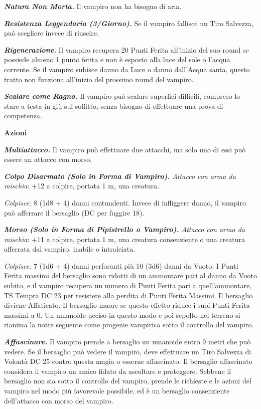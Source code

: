 \begin{multicols}{2}
{\emph{\textbf{Natura Non Morta.}} Il vampiro non ha bisogno di aria.

\emph{\textbf{Resistenza Leggendaria (3/Giorno).}} Se il vampiro fallisce un Tiro Salvezza, può scegliere invece di riuscire.

\emph{\textbf{Rigenerazione.}} Il vampiro recupera 20 Punti Ferita all'inizio del suo round se possiede almeno 1 punto ferita e non è esposto alla luce del sole o l'acqua corrente. Se il vampiro subisce danno da Luce o danno dall'Acqua santa, questo tratto non funziona all'inizio del prossimo round del vampiro.

\emph{\textbf{Scalare come Ragno.}} Il vampiro può scalare superfici difficili, compreso lo stare a testa in giù sul soffitto, senza bisogno di effettuare una prova di competenza.

\textbf{Azioni}

\emph{\textbf{Multiattacco.}} Il vampiro può effettuare due attacchi, ma solo uno di essi può essere un attacco con morso.

\emph{\textbf{Colpo Disarmato (Solo in Forma di Vampiro).} Attacco con arma da mischia}: +12 a colpire, portata 1 m, una creatura.

\emph{Colpisce:} 8 (1d8 + 4) danni contundenti. Invece di infliggere danno, il vampiro può afferrare il bersaglio (DC per fuggire 18).

\emph{\textbf{Morso (Solo in Forma di Pipistrello o Vampiro).} Attacco con arma da mischia}: +11 a colpire, portata 1 m, una creatura consenziente o una creatura afferrata dal vampiro, inabile o intralciata.

\emph{Colpisce:} 7 (1d6 + 4) danni perforanti più 10 (3d6) danni da Vuoto. I Punti Ferita massimi del bersaglio sono ridotti di un ammontare pari al danno da Vuoto subito, e il vampiro recupera un numero di Punti Ferita pari a quell'ammontare, TS Tempra DC 23 per resistere alla perdita di Punti Ferita Massimi. Il bersaglio diviene Affaticato. Il bersaglio muore se questo effetto riduce i suoi Punti Ferita massimi a 0. Un umanoide ucciso in questo modo e poi sepolto nel terreno si rianima la notte seguente come progenie vampirica sotto il controllo del vampiro.

\emph{\textbf{Affascinare.}} Il vampiro prende a bersaglio un umanoide entro 9 metri che può vedere. Se il bersaglio può vedere il vampiro, deve effettuare un Tiro Salvezza di Volontà DC 25 contro questa magia o esserne affascinato. Il bersaglio affascinato considera il vampiro un amico fidato da ascoltare e proteggere. Sebbene il bersaglio non sia sotto il controllo del vampiro, prende le richieste e le azioni del vampiro nel modo più favorevole possibile, ed è un bersaglio consenziente dell'attacco con morso del vampiro.

}
\end{multicols}
